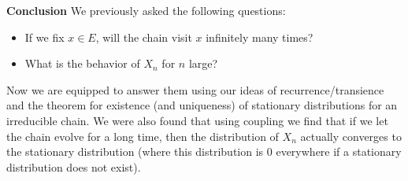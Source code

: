 \noindent \textbf{Conclusion} We previously asked the following questions:
\begin{itemize}
	\item If we fix $x \in E$, will the chain visit $x$ infinitely many times?
	\item What is the behavior of $X_n$ for $n$ large?
\end{itemize}
Now we are equipped to answer them using our ideas of recurrence/transience and the theorem for existence (and uniqueness) of stationary distributions for an irreducible chain. We were also found that using coupling we find that if we let the chain evolve for a long time, then the distribution of $X_n$ actually converges to the stationary distribution (where this distribution is 0 everywhere if a stationary distribution does not exist).


